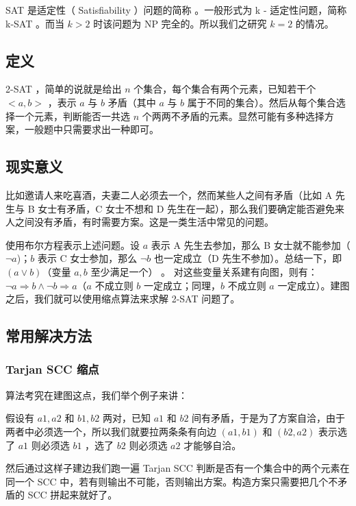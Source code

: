
\begin{QUOTE}{}{}
SAT 是适定性（ Satisfiability ）问题的简称 。一般形式为 k - 适定性问题，简称 k-SAT 。而当 $k>2$ 时该问题为 NP 完全的。所以我们之研究 $k=2$ 的情况。
\end{QUOTE}

\subsection{定义}

2-SAT ，简单的说就是给出 $n$ 个集合，每个集合有两个元素，已知若干个 $<a,b>$ ，表示 $a$ 与 $b$ 矛盾（其中 $a$ 与 $b$ 属于不同的集合）。然后从每个集合选择一个元素，判断能否一共选 $n$ 个两两不矛盾的元素。显然可能有多种选择方案，一般题中只需要求出一种即可。

\subsection{现实意义}

比如邀请人来吃喜酒，夫妻二人必须去一个，然而某些人之间有矛盾（比如 A 先生与 B 女士有矛盾，C 女士不想和 D 先生在一起），那么我们要确定能否避免来人之间没有矛盾，有时需要方案。这是一类生活中常见的问题。

使用布尔方程表示上述问题。设 $a$ 表示 A 先生去参加，那么 B 女士就不能参加（$\neg a$)；$b$ 表示 C 女士参加，那么 $\neg b$ 也一定成立（D 先生不参加）。总结一下，即 $(a \vee b)$（变量 $a, b$ 至少满足一个） 。 对这些变量关系建有向图，则有：$\neg a\Rightarrow b\wedge\neg b\Rightarrow a$（$a$ 不成立则 $b$ 一定成立；同理，$b$ 不成立则 $a$ 一定成立）。建图之后，我们就可以使用缩点算法来求解 2-SAT 问题了。

\subsection{常用解决方法}

\subsubsection{Tarjan  SCC 缩点 }

算法考究在建图这点，我们举个例子来讲：

假设有 ${a1,a2}$ 和 ${b1,b2}$ 两对，已知 $a1$ 和 $b2$ 间有矛盾，于是为了方案自洽，由于两者中必须选一个，所以我们就要拉两条条有向边 $(a1,b1)$ 和 $(b2,a2)$ 表示选了 $a1$ 则必须选 $b1$ ，选了 $b2$ 则必须选 $a2$ 才能够自洽。

然后通过这样子建边我们跑一遍 Tarjan SCC 判断是否有一个集合中的两个元素在同一个 SCC 中，若有则输出不可能，否则输出方案。构造方案只需要把几个不矛盾的 SCC 拼起来就好了。

